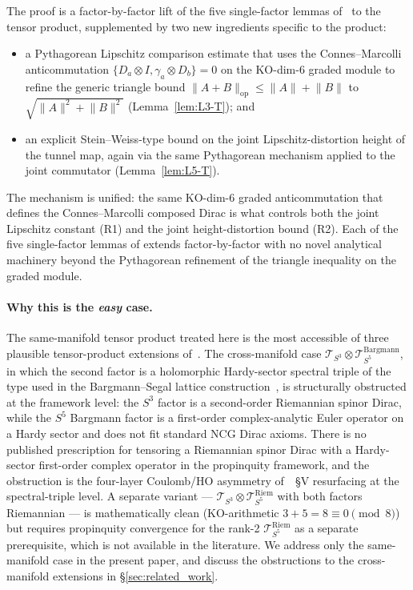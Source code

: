 \documentclass[11pt,a4paper]{article}
\theoremstyle{plain}
\theoremstyle{definition}
\newcommand{\sthree}{S^{3}}
\newcommand{\Tcal}{\mathcal{T}}
\newcommand{\norm}[1]{\lVert #1 \rVert}
\begin{document}
The proof is a factor-by-factor lift of the five single-factor lemmas
of~\cite{loutey_paper38} to the tensor product, supplemented by two
new ingredients specific to the product:
\begin{itemize}\setlength{\itemsep}{2pt}
\item a Pythagorean Lipschitz comparison estimate that uses the
Connes--Marcolli anticommutation
$\{D_a \otimes I, \gamma_a \otimes D_b\} = 0$ on the KO-dim-6 graded
module to refine the generic triangle bound
$\norm{A + B}_{\mathrm{op}} \le \norm{A} + \norm{B}$ to
$\sqrt{\norm{A}^2 + \norm{B}^2}$ (Lemma~\ref{lem:L3-T}); and
\item an explicit Stein--Weiss-type bound on the joint
Lipschitz-distortion height of the tunnel map, again via the same
Pythagorean mechanism applied to the joint commutator
(Lemma~\ref{lem:L5-T}).
\end{itemize}

The mechanism is unified: the same KO-dim-6 graded anticommutation
that defines the Connes--Marcolli composed Dirac is what controls both
the joint Lipschitz constant (R1) and the joint height-distortion
bound (R2). Each of the five single-factor lemmas of
\cite{loutey_paper38} extends factor-by-factor with no novel
analytical machinery beyond the Pythagorean refinement of the triangle
inequality on the graded module.

\paragraph{Why this is the \emph{easy} case.}
The same-manifold tensor product treated here is the most accessible
of three plausible tensor-product extensions of~\cite{loutey_paper38}.
The cross-manifold case
$\Tcal_{\sthree} \otimes \Tcal_{S^5}^{\mathrm{Bargmann}}$, in which the
second factor is a holomorphic Hardy-sector spectral triple of the
type used in the Bargmann--Segal lattice
construction~\cite{paper24}, is structurally obstructed at the
framework level: the $\sthree$ factor is a second-order Riemannian
spinor Dirac, while the $S^5$ Bargmann factor is a first-order
complex-analytic Euler operator on a Hardy sector and does not fit
standard NCG Dirac axioms. There is no published prescription for
tensoring a Riemannian spinor Dirac with a Hardy-sector first-order
complex operator in the propinquity framework, and the obstruction is
the four-layer Coulomb/HO asymmetry of~\cite{paper24}~\S V resurfacing
at the spectral-triple level. A separate variant ---
$\Tcal_{\sthree} \otimes \Tcal_{S^5}^{\mathrm{Riem}}$ with both factors
Riemannian --- is mathematically clean (KO-arithmetic $3+5=8\equiv
0\pmod 8$) but requires propinquity convergence for the rank-2
$\Tcal_{S^5}^{\mathrm{Riem}}$ as a separate prerequisite, which is not
available in the literature. We address only the same-manifold case in
the present paper, and discuss the obstructions to the cross-manifold
extensions in \S\ref{sec:related_work}.
\end{document}
